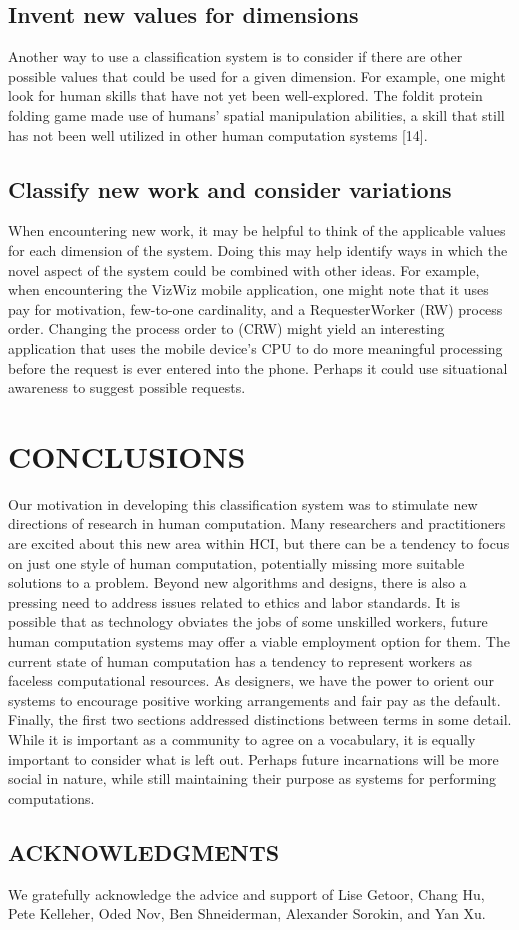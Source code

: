 \documentclass{sig-alternate}
\begin{document}
\subsection*{Invent new values for dimensions}
Another way to use a classification system is to consider if there are other possible values that could be used for a given dimension. For example, one might look for human skills that have not yet been well-explored. The foldit protein folding game made use of humans' spatial manipulation abilities, a skill that still has not been well utilized in other human computation systems [14].
\subsection*{Classify new work and consider variations}
When encountering new work, it may be helpful to think of the applicable values for each dimension of the system. Doing this may help identify ways in which the novel aspect of the system could be combined with other ideas. For example, when encountering the VizWiz mobile application, one might note that it uses pay for motivation, few-to-one cardinality, and a RequesterWorker (RW) process order. Changing the process order to (CRW) might yield an interesting application that uses the mobile device’s CPU to do more meaningful processing before the request is ever entered into the phone. Perhaps it could use situational awareness to suggest possible requests.
\section*{CONCLUSIONS}
Our motivation in developing this classification system was to stimulate new directions of research in human computation. Many researchers and practitioners are excited about this new area within HCI, but there can be a tendency to focus on just one style of human computation, potentially missing more suitable solutions to a problem.
Beyond new algorithms and designs, there is also a pressing need to address issues related to ethics and labor standards. It is possible that as technology obviates the jobs of some unskilled workers, future human computation systems may offer a viable employment option for them. The current state of human computation has a tendency to represent workers as faceless computational resources. As designers, we have the power to orient our systems to encourage positive working arrangements and fair pay as the default.
Finally, the first two sections addressed distinctions between terms in some detail. While it is important as a community to agree on a vocabulary, it is equally important to consider what is left out. Perhaps future incarnations will be more social in nature, while still maintaining their purpose as systems for performing computations.
\subsection*{ACKNOWLEDGMENTS}
We gratefully acknowledge the advice and support of Lise Getoor, Chang Hu, Pete Kelleher, Oded Nov, Ben Shneiderman, Alexander Sorokin, and Yan Xu.
\subsection*{}






%
%

\balancecolumns
\end{document}
